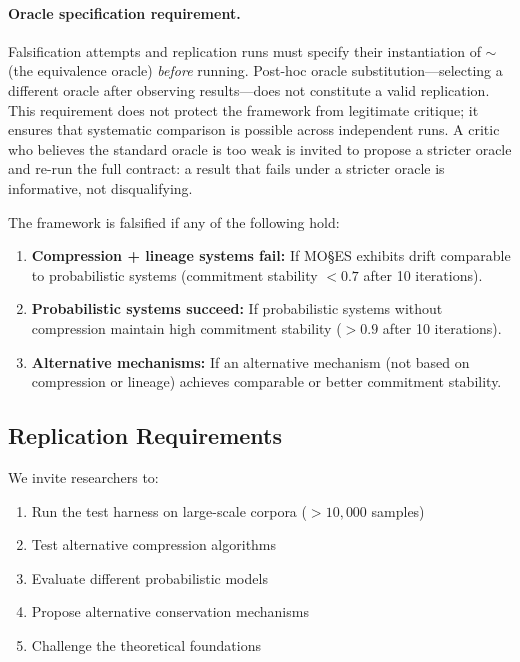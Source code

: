 \documentclass[11pt,a4paper]{article}
\begin{document}
\paragraph{Oracle specification requirement.}
Falsification attempts and replication runs must specify their instantiation of $\sim$ (the equivalence oracle) \emph{before} running. Post-hoc oracle substitution---selecting a different oracle after observing results---does not constitute a valid replication. This requirement does not protect the framework from legitimate critique; it ensures that systematic comparison is possible across independent runs. A critic who believes the standard oracle is too weak is invited to propose a stricter oracle and re-run the full contract: a result that fails under a stricter oracle is informative, not disqualifying.

The framework is falsified if any of the following hold:

\begin{enumerate}
    \item \textbf{Compression + lineage systems fail:} If MO\S{}ES\texttrademark{} exhibits drift comparable to probabilistic systems (commitment stability $< 0.7$ after 10 iterations).

    \item \textbf{Probabilistic systems succeed:} If probabilistic systems without compression maintain high commitment stability ($> 0.9$ after 10 iterations).

    \item \textbf{Alternative mechanisms:} If an alternative mechanism (not based on compression or lineage) achieves comparable or better commitment stability.
\end{enumerate}

\subsection{Replication Requirements}

We invite researchers to:
\begin{enumerate}
    \item Run the test harness on large-scale corpora ($>10{,}000$ samples)
    \item Test alternative compression algorithms
    \item Evaluate different probabilistic models
    \item Propose alternative conservation mechanisms
    \item Challenge the theoretical foundations
\end{enumerate}
\end{document}

